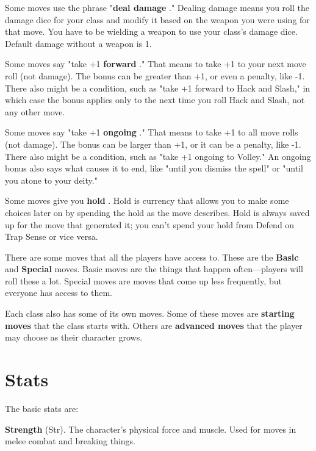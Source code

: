 Some moves use the phrase "{\bf deal damage} ." Dealing damage means you roll the damage dice for your class and modify it based on the weapon you were using for that move. You have to be wielding a weapon to use your class's damage dice. Default damage without a weapon is 1.

 

Some moves say "take +1 {\bf forward} ." That means to take +1 to your next move roll (not damage). The bonus can be greater than +1, or even a penalty, like -1. There also might be a condition, such as "take +1 forward to Hack and Slash," in which case the bonus applies only to the next time you roll Hack and Slash, not any other move.

 

Some moves say "take +1 {\bf ongoing} ." That means to take +1 to all move rolls (not damage). The bonus can be larger than +1, or it can be a penalty, like -1. There also might be a condition, such as "take +1 ongoing to Volley." An ongoing bonus also says what causes it to end, like "until you dismiss the spell" or "until you atone to your deity."

 

Some moves give you {\bf hold} . Hold is currency that allows you to make some choices later on by spending the hold as the move describes. Hold is always saved up for the move that generated it; you can't spend your hold from Defend on Trap Sense or vice versa.

 

There are some moves that all the players have access to. These are the {\bf Basic}  and {\bf Special}  moves. Basic moves are the things that happen often—players will roll these a lot. Special moves are moves that come up less frequently, but everyone has access to them.

 

Each class also has some of its own moves. Some of these moves are {\bf starting moves}  that the class starts with. Others are {\bf advanced moves}  that the player may choose as their character grows.

 
\section{Stats}   
 

The basic stats are:

 

{\bf Strength}  (Str). The character's physical force and muscle. Used for moves in melee combat and breaking things.

